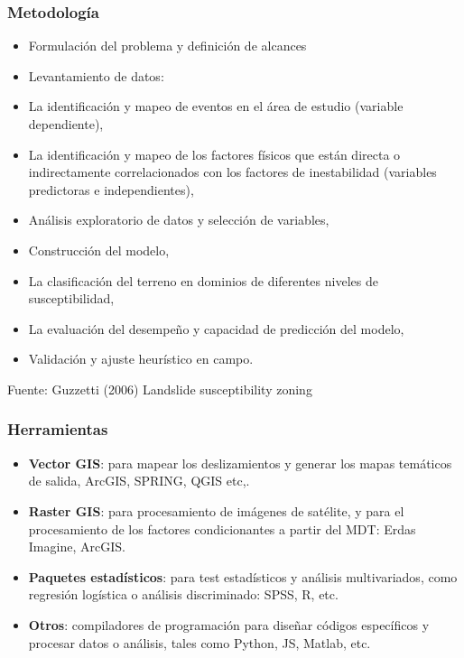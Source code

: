 \documentclass[12pt]{beamer}
\begin{document}
\begin{frame}
\frametitle{Metodología}
\scriptsize{
\begin{itemize}
\item Formulación del problema y definición de alcances
\vfill
\item Levantamiento de datos: 
\vfill
\item La identificación y mapeo de eventos en el área de estudio (variable dependiente),
\vfill
\item La identificación y mapeo de los factores físicos que están directa o indirectamente correlacionados con los factores de inestabilidad (variables predictoras e independientes),
\vfill
\item Análisis exploratorio de datos y selección de variables,
\vfill
\item Construcción del modelo,
\vfill
\item La clasificación del terreno en dominios  de diferentes niveles de susceptibilidad,
\vfill
\item La evaluación del desempeño y capacidad de predicción del modelo,
\vfill
\item Validación y ajuste heurístico en campo.
\end{itemize}
}
\vfill
\tiny{Fuente: Guzzetti (2006) Landslide susceptibility zoning }
\end{frame}
\begin{frame}
\frametitle{Herramientas}
\scriptsize{
\begin{itemize}
\item \textbf{Vector GIS}: para mapear los deslizamientos y generar los mapas temáticos de salida, ArcGIS, SPRING, QGIS etc,.
\vfill
\item \textbf{Raster GIS}: para procesamiento de imágenes de satélite, y para el procesamiento de los factores condicionantes a partir del MDT: Erdas Imagine, ArcGIS.
\vfill
\item \textbf{Paquetes estadísticos}: para test estadísticos y análisis multivariados, como regresión logística o análisis discriminado: SPSS, R, etc.
\vfill
\item \textbf{Otros}: compiladores de programación para diseñar códigos específicos y procesar datos o análisis, tales como Python, JS, Matlab, etc.
\end{itemize}
}
\end{frame}
\end{document}
